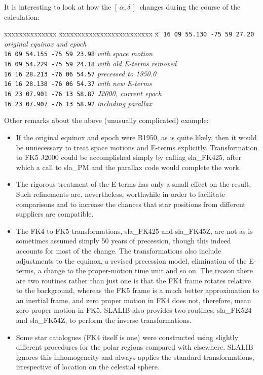 \documentclass[11pt,twoside,nolof]{starlink}
\providecommand{\radec}     {$[\,\alpha,\delta\,]$}
\begin{document}
\goodbreak
It is interesting to look at how the \radec\ changes during the
course of the calculation:
\begin{tabbing}
xxxxxxxxxxxxxx \= xxxxxxxxxxxxxxxxxxxxxxxxx \= x \= \kill
\> \texttt{16 09 55.130 -75 59 27.20} \> \> \textit{original equinox and epoch} \\
\> \texttt{16 09 54.155 -75 59 23.98} \> \> \textit{with space motion} \\
\> \texttt{16 09 54.229 -75 59 24.18} \> \> \textit{with old E-terms removed} \\
\> \texttt{16 16 28.213 -76 06 54.57} \> \> \textit{precessed to 1950.0} \\
\> \texttt{16 16 28.138 -76 06 54.37} \> \> \textit{with new E-terms} \\
\> \texttt{16 23 07.901 -76 13 58.87} \> \> \textit{J2000, current epoch} \\
\> \texttt{16 23 07.907 -76 13 58.92} \> \> \textit{including parallax}
\end{tabbing}

Other remarks about the above (unusually complicated) example:
\begin{itemize}
\item If the original equinox and epoch were B1950, as is quite
      likely, then it would be unnecessary to treat space motions
      and E-terms explicitly.  Transformation to FK5 J2000 could
      be accomplished simply by calling
sla\_FK425, after which
      a call to
sla\_PM and the parallax code would complete the
      work.
\item The rigorous treatment of the E-terms
      has only a small effect on the result.  Such refinements
      are, nevertheless, worthwhile in order to facilitate comparisons and
      to increase the chances that star positions from different
      suppliers are compatible.
\item The FK4 to FK5 transformations,
sla\_FK425
      and
sla\_FK45Z,
      are not as is sometimes assumed simply 50 years of precession,
      though this indeed accounts for most of the change.  The
      transformations also include adjustments
      to the equinox, a revised precession model, elimination of the
      E-terms, a change to the proper-motion time unit and so on.
      The reason there are two routines rather than just one
      is that the FK4 frame rotates relative to the background, whereas
      the FK5 frame is a much better approximation to an
      inertial frame, and zero proper
      motion in FK4 does not, therefore, mean zero proper motion in FK5.
      SLALIB also provides two routines,
sla\_FK524
      and
sla\_FK54Z,
      to perform the inverse transformations.
\item Some star catalogues (FK4 itself is one) were constructed using slightly
      different procedures for the polar regions compared with
      elsewhere.  SLALIB ignores this inhomogeneity and always
      applies the standard
      transformations, irrespective of location on the celestial sphere.
\end{itemize}
\end{document}
